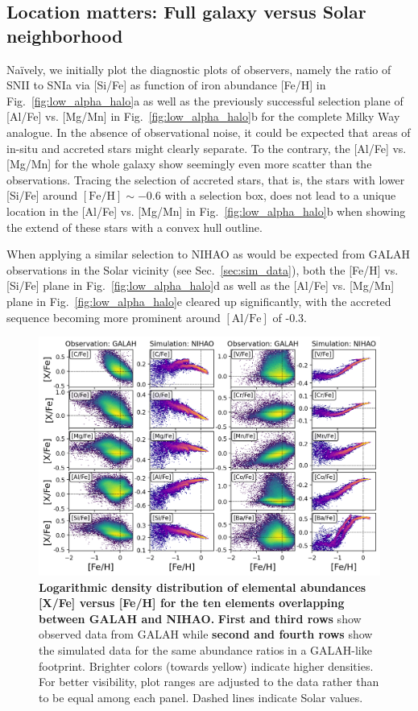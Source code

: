 \documentclass[fleqn,usenatbib]{mnras}
\begin{document}
\subsection{Location matters: Full galaxy versus Solar neighborhood} \label{sec:location}

Naïvely, we initially plot the diagnostic plots of observers, namely the ratio of SNII to SNIa via [Si/Fe] as function of iron abundance [Fe/H] in Fig.~\ref{fig:low_alpha_halo}a as well as the previously successful selection plane of [Al/Fe] vs. [Mg/Mn] in Fig.~\ref{fig:low_alpha_halo}b for the complete Milky Way analogue. In the absence of observational noise, it could be expected that areas of in-situ and accreted stars might clearly separate. To the contrary, the [Al/Fe] vs. [Mg/Mn] for the whole galaxy show seemingly even more scatter than the observations. Tracing the selection of accreted stars, that is, the stars with lower [Si/Fe] around $\mathrm{[Fe/H]} \sim -0.6$ with a selection box, does not lead to a unique location in the [Al/Fe] vs. [Mg/Mn] in Fig.~\ref{fig:low_alpha_halo}b when showing the extend of these stars with a convex hull outline.

When applying a similar selection to NIHAO as would be expected from GALAH observations in the Solar vicinity (see Sec.~\ref{sec:sim_data}), both the [Fe/H] vs. [Si/Fe] plane in Fig.~\ref{fig:low_alpha_halo}d as well as the [Al/Fe] vs. [Mg/Mn] plane in Fig.~\ref{fig:low_alpha_halo}e cleared up significantly, with the accreted sequence becoming more prominent around $\mathrm{[Al/Fe]}$ of -0.3.

\begin{figure}
	\includegraphics[width=\textwidth]{figures/Overview_FeH_XFe_Obs_Sim.png}
    \caption{
    \textbf{Logarithmic density distribution of elemental abundances [X/Fe] versus [Fe/H] for the ten elements overlapping between GALAH and NIHAO.} 
    \textbf{First and third rows} show observed data from GALAH while \textbf{second and fourth rows} show the simulated data for the same abundance ratios in a GALAH-like footprint. Brighter colors (towards yellow) indicate higher densities. For better visibility, plot ranges are adjusted to the data rather than to be equal among each panel. Dashed lines indicate Solar values.}
    \label{fig:FeH_XFe}
\end{figure}
\end{document}
